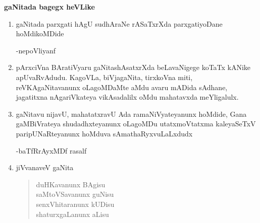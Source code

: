 \begin{center}
{\bf gaNitada bagegx heVLike}
\end{center}

\begin{enumerate}[\rm 1)]
\item gaNitada parxgati hAgU sudhAraNe rASaTxrXda parxgatiyoDane hoMdikoMDide

\hfill{-nepoVliyanf}

\item pArxciVna BAratiVyaru gaNitashAsatxrXda beLavaNigege koTaTx kANike apUvaRvAdudu. KagoVLa, biVjagaNita, tirxkoVna miti, reVKAgaNitavanunx oLagoMDaMte aMdu avaru mADida sAdhane, jagatitxna nAgariVkateya vikAsadalilx oMdu mahatavxda meYligalulx.

\item gaNitavu nijavU, mahatatxravU Ada ramaNiVyateyanunx hoMdide, Gana gaMBiVrateya shudadhxteyanunx oLagoMDu utatxmoVtatxma kaleyaSeTxV paripUNaRte\-yanunx hoMduva sAmathaRyxvuLaLxdudx 

\hfill{-baTfRrAyxMDf rasalf}

\item jiVvanaveV gaNita
\begin{center}
\begin{verse}
duHKavanunx BAgisu\\
saMtoVSavanunx guNisu\\
senxVhitaranunx kUDisu\\
shaturxgaLanunx aLisu
\end{verse}
\end{center}
\end{enumerate}
